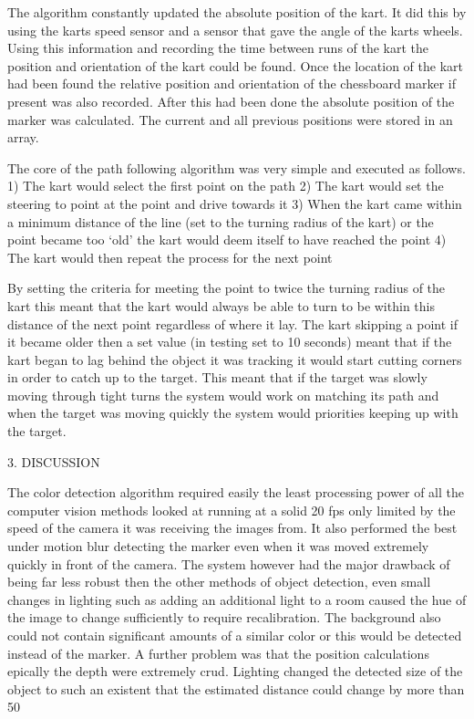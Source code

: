 The algorithm constantly updated the absolute position of the kart. It did this by using the karts speed sensor and a sensor that gave the angle of the karts wheels. Using this information and recording the time between runs of the kart the position and orientation of the kart could be found. Once the location of the kart had been found the relative position and orientation of the chessboard marker if present was also recorded. After this had been done the absolute position of the marker was calculated. The current and all previous positions were stored in an array.

The core of the path following algorithm was very simple and executed as follows. 
1) The kart would select the first point on the path
2) The kart would set the steering to point at the point and drive towards it
3) When the kart came within a minimum distance of the line (set to the turning radius of the kart)  or the point became too ‘old’ the kart would deem itself to have reached the point
4) The kart would then repeat the process for the next point

By setting the criteria for meeting the point to twice the turning radius of the kart this meant that the kart would always be able to turn to be within this distance  of the next point regardless of where it lay. The kart skipping a point if it became older then a set value (in testing set to 10 seconds) meant that if the kart began to lag behind the object it was tracking it would start cutting corners in order to catch up to the target. This meant that if the target was slowly moving through tight turns the system would work on matching its path and when the target was moving quickly the system would priorities keeping up with the target. 

3.	DISCUSSION

The color detection algorithm required easily the least processing power of all the computer vision methods looked at running at a solid 20 fps only limited by the speed of the camera it was receiving the images from. It also performed the best under motion blur  detecting the marker even when it was moved extremely quickly in front of the camera. The system however had the major drawback of being far less robust then the other methods of object detection, even small changes in lighting such as adding an additional light to a room caused the hue of the image to change sufficiently to require recalibration. The background also could not contain significant amounts of a similar color or this would be detected instead of the marker. A further problem was that the position calculations epically the depth were extremely crud. Lighting changed the detected size of the object to such an existent that the estimated distance could change by more than 50%

